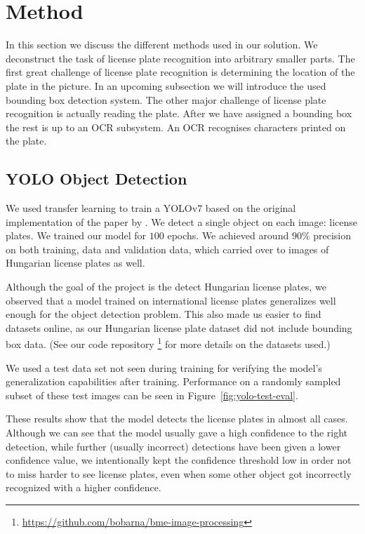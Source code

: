 \section{Method}
\label{method}
In this section we discuss the different methods used in our solution.  We
deconstruct the task of license plate recognition into arbitrary smaller parts.
The first great challenge of license plate recognition is determining the
location of the plate in the picture.  In an upcoming subsection we will
introduce the used bounding box detection system.  The other major challenge of
license plate recognition is actually reading the plate.  After we have assigned
a bounding box the rest is up to an \ac{OCR} subsystem.  An \ac{OCR} recognises
characters printed on the plate.

\subsection{YOLO Object Detection}
We used transfer learning to train a YOLOv7 based on the original implementation
of the paper by \cite{yolov7}. We detect a single object on each image: license
plates. We trained our model for $100$ epochs. We achieved around $90\%$
precision on both training, data and validation data, which carried over to
images of Hungarian license plates as well.

Although the goal of the project is the detect Hungarian license plates, we
observed that a model trained on international license plates generalizes well
enough for the object detection problem. This also made us easier to find
datasets online, as our Hungarian license plate dataset did not include bounding
box data. (See our code repository
\footnote{\url{https://github.com/bobarna/bme-image-processing}} for more
details on the datasets used.)

We used a test data set not seen during training for verifying the model's
generalization capabilities after training. Performance on a randomly sampled
subset of these test images can be seen in Figure~\ref{fig:yolo-test-eval}.

These results show that the model detects the license plates in almost all
cases. Although we can see that the model usually gave a high confidence to the
right detection, while further (usually incorrect) detections have been given
a lower confidence value, we intentionally kept the confidence threshold low in
order not to miss harder to see license plates, even when some other object got
incorrectly recognized with a higher confidence.

